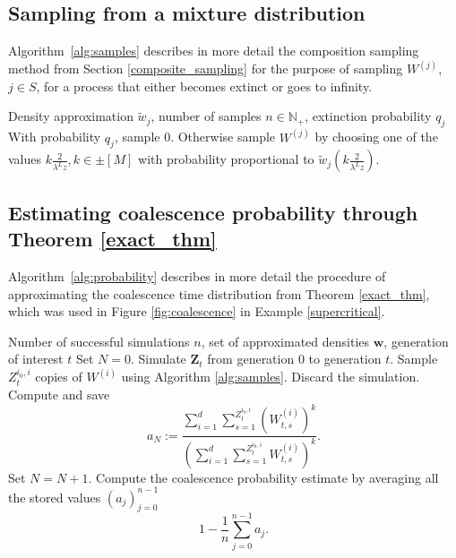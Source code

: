 \documentclass[preprint,3p,12pt]{elsarticle}
\theoremstyle{definition}
\newcommand{\z}[1][i_0, i]{Z_t^{#1}}
\begin{document}
\subsection{Sampling from a mixture distribution} 
Algorithm~\ref{alg:samples} describes in more detail the composition sampling method from Section \ref{composite_sampling} for the purpose of sampling $W^{(j)}$, $j \in S$, for a process that either becomes extinct or goes to infinity.
\begin{algorithm}
\caption{Sampling from $W^{(j)}$}
\label{alg:samples}
\begin{algorithmic}[1] %
\REQUIRE Density approximation $\tilde{w}_j$, number of samples $n \in \mathbb{N}_+$, extinction probability $q_j$
    \STATE With probability $q_j$, sample 0.
    \STATE Otherwise sample $W^{(j)}$ by choosing one of the values $k\frac{2}{\lambda^L z}, k \in \pm[M]$ with probability proportional to $\tilde{w}_j(k\frac{2}{\lambda^L z})$.
\ENDFOR
\end{algorithmic}
\end{algorithm}
\subsection{Estimating coalescence probability through Theorem \ref{exact_thm}}
Algorithm~\ref{alg:probability} describes in more detail the procedure of approximating the coalescence time distribution from Theorem \ref{exact_thm}, which was used in Figure \ref{fig:coalescence} in Example \ref{supercritical}.
\begin{algorithm}
\caption{Simulation procedure with densities $\boldsymbol{w}$}
\label{alg:probability}
\begin{algorithmic}[1]
\REQUIRE Number of successful simulations $n$, set of approximated densities $\boldsymbol{w}$, generation of interest $t$
\STATE Set $N = 0$.
    \STATE Simulate $\boldsymbol{Z}_{t}$ from generation 0 to generation $t$.
        \STATE Sample $\z$ copies of $W^{(i)}$ using Algorithm \ref{alg:samples}.
    \ENDFOR
    \IF{(for all $i \in [d]: W^{(i)} = 0 )\lor( \z = 0)$}
    \STATE Discard the simulation.
    \ELSE
        \STATE Compute and save
        \begin{equation}
       a_N :=     \frac{\sum_{i=1}^d\sum_{s=1}^{\z} (W_{t, s}^{(i)})^k}
            {\left(\sum_{i=1}^d\sum_{s=1}^{\z} W_{t, s}^{(i)}\right)^k}.
        \end{equation}
        \STATE Set $N = N+1$.
    \ENDIF
\ENDWHILE
\STATE Compute the coalescence probability estimate by averaging all the stored values $(a_j)_{j=0}^{n-1}$
\begin{equation}
    1 - \frac{1}{n}\sum_{j=0}^{n-1} a_j.
\end{equation}
\end{algorithmic}
\end{algorithm}
\end{document}

